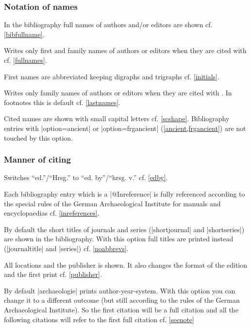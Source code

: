 \documentclass[a4paper,
10pt,
greek,
french,
spanish,
italian,
ngerman,
english
]{ltxdoc}
\begin{document}
\subsubsection{Notation of names}

In the bibliography full names of authors and/or editors are shown cf. \cref{bibfullname}.

Writes only first and family names of authors or editors when they are cited with  cf. \cref{fullnames}.

First names are abbreviated keeping digraphs and trigraphs cf. \cref{initials}.

Writes only family names of authors or editors when they are cited with .
In footnotes this is default cf.  \cref{lastnames}.

Cited names are shown with small capital letters cf. \cref{scshape}.
Bibliography entries with |option={ancient}| or |option={frgancient}| (\cref{ancient,frgancient}) are not touched by this option.

\subsubsection{Manner of citing}

Switches \enquote{ed.}/\enquote{Hrsg.} to \enquote{ed. by}/\enquote{hrsg. v.} cf. \cref{edby}.

Each bibliography entry which is a |@Inreference| is fully referenced according to the special rules of the German Archaeological Institute for manuals and encyclopaedias cf. \cref{inreferences}.

By default the short titles of journals and series (|shortjournal| and |shortseries|) are shown in the bibliography.
With this option full titles are printed instead (|journaltitle| and |series|) cf. \cref{noabbrevs}.

All locations and the publisher is shown. It also changes the format of the edition and the first print cf. \cref{publisher}.

By default |archaeologie| prints author-year-system. 
With this option you can change it to a different outcome (but still according to the rules of the German Archaeological Institute). 
So the first citation will be a full citation and all the following citations will refer to the first full citation cf. \cref{seenote}
\end{document}

